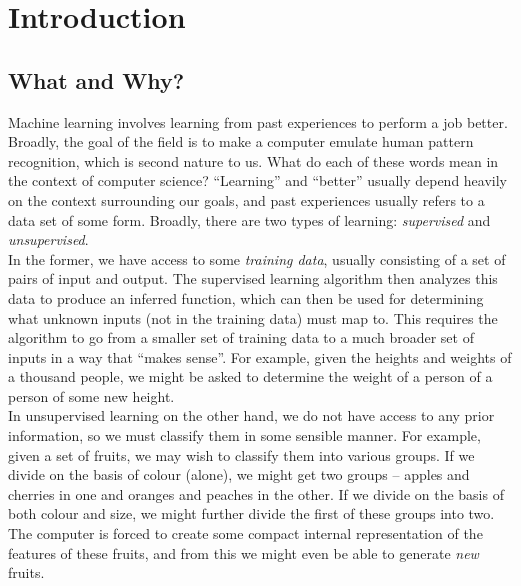 \documentclass{article}
\begin{document}
\thispagestyle{empty}

\titleBC
\tableofcontents
\clearpage

\setcounter{section}{-1}


% 

\section{Introduction}

	\subsection{What and Why?}

		Machine learning involves learning from past experiences to perform a job better.\\
		Broadly, the goal of the field is to make a computer emulate human pattern recognition, which is second nature to us.
		What do each of these words mean in the context of computer science? ``Learning'' and ``better'' usually depend heavily on the context surrounding our goals, and past experiences usually refers to a data set of some form. Broadly, there are two types of learning: \emph{supervised} and \emph{unsupervised}.\\

		In the former, we have access to some \emph{training data}, usually consisting of a set of pairs of input and output. The supervised learning algorithm then analyzes this data to produce an inferred function, which can then be used for determining what unknown inputs (not in the training data) must map to. This requires the algorithm to go from a smaller set of training data to a much broader set of inputs in a way that ``makes sense''. For example, given the heights and weights of a thousand people, we might be asked to determine the weight of a person of a person of some new height.\\
		In unsupervised learning on the other hand, we do not have access to any prior information, so we must classify them in some sensible manner. For example, given a set of fruits, we may wish to classify them into various groups. If we divide on the basis of colour (alone), we might get two groups -- apples and cherries in one and oranges and peaches in the other. If we divide on the basis of both colour and size, we might further divide the first of these groups into two. The computer is forced to create some compact internal representation of the features of these fruits, and from this we might even be able to generate \emph{new} fruits.\\
\end{document}
